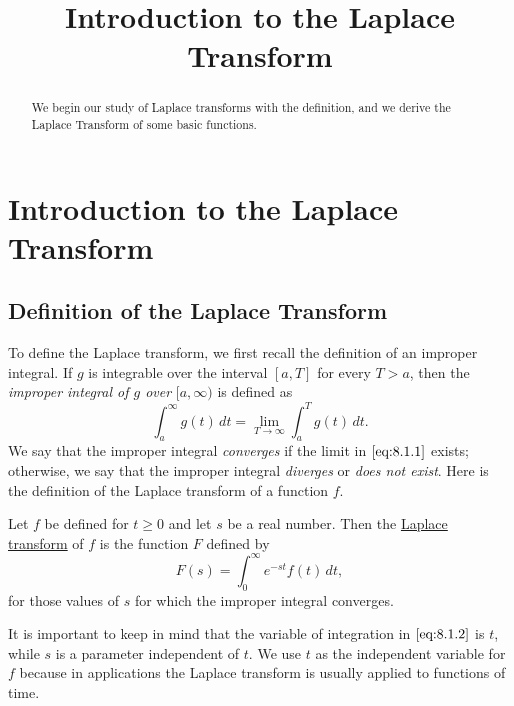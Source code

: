 \documentclass{ximera}
\title{Introduction to the Laplace Transform}%
\begin{document}
\begin{abstract}
We begin our study of Laplace transforms with the definition, and we derive the Laplace Transform of some basic functions.
\end{abstract}

\maketitle

\section*{Introduction to the Laplace Transform}

\subsection*{Definition of the Laplace Transform}

 
To define the Laplace transform, we first recall the definition of an
improper integral. If $g$ is integrable over the
interval $[a,T]$ for every $T>a$, then the \textit{improper
integral of
$g$ over} $[a,\infty)$ is defined as
\begin{equation} \label{eq:8.1.1}
\int^\infty_a g(t)\,dt=\lim_{T\rightarrow\infty}\int^T_a g(t)\,dt.
\end{equation}
We say that the improper integral \textit{converges} if the limit in
$\eqref{eq:8.1.1}$ exists;   otherwise, we say that the improper integral
\textit{diverges} or \textit{does not exist}. Here is the definition of
the Laplace transform of a function $f$.

\begin{definition}\label{thmtype:8.1.1}
Let $f$ be defined for $t\geq 0$ and let $s$ be a real number. Then the
\href{https://en.wikipedia.org/wiki/Laplace_transform}{Laplace transform} of $f$ is the function $F$ defined by
\begin{equation}\label{eq:8.1.2} F(s)=\int_0^\infty e^{-st} f(t)\,dt,
\end{equation} for those values of $s$ for which the improper integral
converges.
\end{definition}

It is important to keep in mind that the variable of integration in
$\eqref{eq:8.1.2}$ is $t$, while $s$ is a parameter independent of $t$. We
use $t$ as the independent variable for $f$ because in applications
the Laplace transform is usually applied to functions of time.
\end{document}
